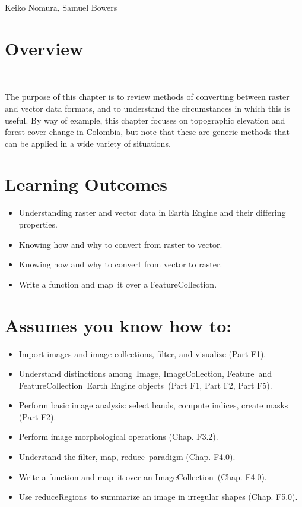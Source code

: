\documentclass[
  letterpaper,
  DIV=11,
  numbers=noendperiod]{scrreprt}
\providecommand{\tightlist}{%
  \setlength{\itemsep}{0pt}\setlength{\parskip}{0pt}}\usepackage{longtable,booktabs,array}
\begin{document}

Keiko Nomura, Samuel Bowers

\hypertarget{overview-17}{%
\section*{Overview}\label{overview-17}}


~

The purpose of this chapter is to review methods of converting between
raster and vector data formats, and to understand the circumstances in
which this is useful. By way of example, this chapter focuses on
topographic elevation and forest cover change in Colombia, but note that
these are generic methods that can be applied in a wide variety of
situations.

\hypertarget{learning-outcomes-17}{%
\section*{Learning Outcomes}\label{learning-outcomes-17}}


\begin{itemize}
\tightlist
\item
  Understanding raster and vector data in Earth Engine and their
  differing properties.
\item
  Knowing how and why to convert from raster to vector.
\item
  Knowing how and why to convert from vector to raster.
\item
  Write a function and map~it over a FeatureCollection.
\end{itemize}

\hypertarget{assumes-you-know-how-to-17}{%
\section*{Assumes you know how to:}\label{assumes-you-know-how-to-17}}


\begin{itemize}
\tightlist
\item
  Import images and image collections, filter, and visualize (Part F1).
\item
  Understand distinctions among~Image, ImageCollection, Feature~and
  FeatureCollection~Earth Engine objects~(Part F1, Part F2, Part F5).
\item
  Perform basic image analysis: select bands, compute indices, create
  masks (Part F2).
\item
  Perform image morphological operations (Chap. F3.2).
\item
  Understand the filter, map, reduce~paradigm (Chap. F4.0).
\item
  Write a function and map~it over an ImageCollection~(Chap. F4.0).
\item
  Use reduceRegions~to summarize an image in irregular shapes (Chap.
  F5.0).
\end{itemize}
\end{document}
